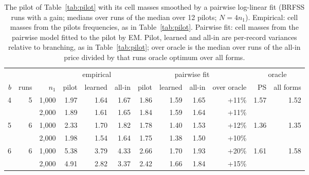 \begin{table}[h]
\centering
\caption{The pilot of Table~\ref{tab:pilot} with its cell masses smoothed by a pairwise log-linear fit (BRFSS runs with a gain; medians over runs of the median over 12 pilots; $N=4n_1$). Empirical: cell masses from the pilot\textquotesingle s frequencies, as in Table~\ref{tab:pilot}. Pairwise fit: cell masses from the pairwise model fitted to the pilot by EM. Pilot, learned and all-in are per-record variances relative to branching, as in Table~\ref{tab:pilot}; over oracle is the median over runs of the all-in price divided by that run\textquotesingle s oracle optimum over all forms.}
\label{tab:pilotsmooth}
\small
\setlength{\tabcolsep}{4pt}
\begin{tabular}{rrr rrr rrrr rr}
\toprule
 & & & \multicolumn{3}{c}{empirical} & \multicolumn{4}{c}{pairwise fit} & \multicolumn{2}{c}{oracle} \\
\cmidrule(lr){4-6}\cmidrule(lr){7-10}\cmidrule(lr){11-12}
$b$ & runs & $n_1$ & pilot & learned & all-in & pilot & learned & all-in & over oracle & PS & all forms \\
\midrule
4 & 5 & 1,000 & 1.97 & 1.64 & 1.67 & 1.86 & 1.59 & 1.65 & +11\% & 1.57 & 1.52 \\
 &  & 2,000 & 1.89 & 1.61 & 1.65 & 1.84 & 1.59 & 1.64 & +11\% &  &  \\
5 & 6 & 1,000 & 2.33 & 1.70 & 1.82 & 1.78 & 1.40 & 1.53 & +12\% & 1.36 & 1.35 \\
 &  & 2,000 & 1.98 & 1.54 & 1.64 & 1.75 & 1.38 & 1.50 & +10\% &  &  \\
6 & 6 & 1,000 & 5.38 & 3.79 & 4.33 & 2.66 & 1.70 & 1.93 & +20\% & 1.61 & 1.58 \\
 &  & 2,000 & 4.91 & 2.82 & 3.37 & 2.42 & 1.66 & 1.84 & +15\% &  &  \\
\bottomrule
\end{tabular}
\end{table}
